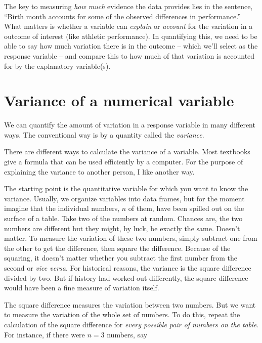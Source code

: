 \documentclass[]{tufte-book}
\begin{document}
The key to measuring \emph{how much} evidence the data provides lies in the sentence, ``Birth month accounts for some of the observed differences in performance.'' What matters is whether a variable can \emph{explain} or \emph{account} for the variation in a outcome of interest (like athletic performance). In quantifying this, we need to be able to say how much variation there is in the outcome -- which we'll select as the response variable -- and compare this to how much of that variation is accounted for by the explanatory variable(s).

\hypertarget{variance-of-a-numerical-variable}{%
\section{Variance of a numerical variable}\label{variance-of-a-numerical-variable}}

We can quantify the amount of variation in a response variable in many different ways. The conventional way is by a quantity called the \emph{variance}.

There are different ways to calculate the variance of a variable. Most textbooks give a formula that can be used efficiently by a computer. For the purpose of explaining the variance to another person, I like another way.

The starting point is the quantitative variable for which you want to know the variance. Usually, we organize variables into data frames, but for the moment imagine that the individual numbers, \(n\) of them, have been spilled out on the surface of a table. Take two of the numbers at random. Chances are, the two numbers are different but they might, by luck, be exactly the same. Doesn't matter. To measure the variation of these two numbers, simply subtract one from the other to get the difference, then square the difference. Because of the squaring, it doesn't matter whether you subtract the first number from the second or \emph{vice versa}. For historical reasons, the variance is the square difference divided by two. But if history had worked out differently, the square difference would have been a fine measure of variation itself.

The square difference measures the variation between two numbers. But we want to measure the variation of the whole set of numbers. To do this, repeat the calculation of the square difference for \emph{every possible pair of numbers on the table}. For instance, if there were \(n=3\) numbers, say
\end{document}
